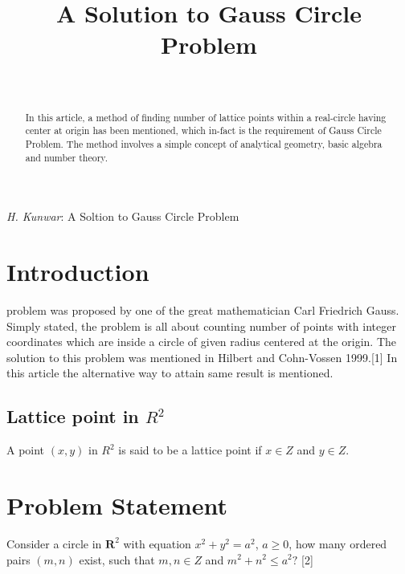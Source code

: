\documentclass[journal,twoside]{IEEEtran}
\begin{document}
    \setcounter{page}{55}
\title{A Solution to Gauss Circle Problem}


\author{\\
}
%
{\textit{H. Kunwar}: A Soltion to Gauss Circle Problem}
\maketitle


\begin{abstract}
In this article, a method of finding number of lattice points within a real-circle having center at origin has been mentioned, which in-fact is the requirement of Gauss Circle Problem. The method involves a simple concept of analytical geometry, basic algebra and number theory.
\end{abstract}




\section{Introduction}
 problem was proposed by one of the great mathematician Carl Friedrich Gauss. Simply stated, the problem is all about counting number of points with integer coordinates which are inside a circle of given radius centered at the origin. The solution to this problem was mentioned in Hilbert and Cohn-Vossen 1999.[1] In this article the alternative way to attain same result is mentioned.
 \subsection{Lattice point in $R^{2}$}
A point $(x,y)$ in $R^{2}$ is said to be a lattice point if $x \in Z$ and $y \in Z$.




\section{Problem Statement}
Consider a circle in $\textbf{R}^{2}$ with equation $x^{2}+y^{2}=a^{2}$, $a \geq 0$, how many ordered pairs $(m,n)$ exist, such that $m,n \in Z$ and $m^{2}+n^{2} \leq a^{2}?$ [2]
\end{document}
